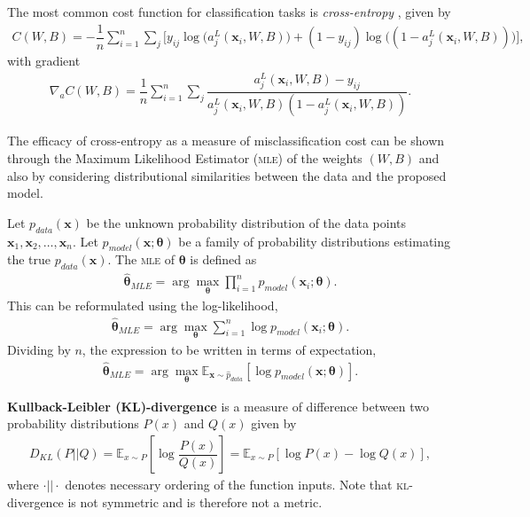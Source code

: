 The most common cost function for classification tasks is \textit{cross-entropy} \cite{Nielson2015}, given by
\begin{align}\label{nnets-cross-entropy-eq}
	C(W,B) = -\dfrac{1}{n}\sum_{i=1}^n\sum_j\big[y_{ij}\log\big(a_j^L(\mathbf{x}_i,W,B)\big) + (1 - y_{ij})\log\big( (1 - a_j^L(\mathbf{x}_i,W,B))\big)\big],
\end{align}
with gradient
\begin{align}
	\nabla_aC(W,B) = \dfrac{1}{n}\sum_{i=1}^n\sum_j\dfrac{a_j^L(\mathbf{x}_i,W,B) - y_{ij}}{a_j^L(\mathbf{x}_i,W,B)(1-a_j^L(\mathbf{x}_i,W,B))}.
\end{align}

The efficacy of cross-entropy as a measure of misclassification cost can be shown through the Maximum Likelihood Estimator (\textsc{mle}) of the weights $(W, B)$ and also by considering distributional similarities between the data and the proposed model.

Let ${p}_{data}(\mathbf{x})$ be the unknown probability distribution of the data points $\mathbf{x}_1, \mathbf{x}_2, \ldots, \mathbf{x}_n$. Let $p_{model}(\mathbf{x}; \mathbf{\theta})$ be a family of probability distributions estimating the true $p_{data}(\mathbf{x})$. The \textsc{mle} of $\mathbf{\theta}$ is defined as
\begin{align}
	\hat{\mathbf{\theta}}_{MLE} = \arg\max_{\mathbf{\theta}}\prod_{i=1}^np_{model}(\mathbf{x}_i;\mathbf{\theta}).
\end{align}
This can be reformulated using the log-likelihood,
\begin{align}
	\hat{\mathbf{\theta}}_{MLE} = \arg\max_{\mathbf{\theta}}\sum_{i=1}^n\log p_{model}(\mathbf{x}_i;\mathbf{\theta}).
\end{align}
Dividing by $n$, the expression to be written in terms of expectation,
\begin{align}\label{nnets-mle-eq}
	\hat{\mathbf{\theta}}_{MLE} = \arg\max_{\mathbf{\theta}}\mathbb{E}_{\mathbf{x}\sim \hat{p}_{data}}\left[\log p_{model}(\mathbf{x}; \mathbf{\theta})\right].
\end{align}

\begin{definition}
	\textbf{Kullback-Leibler (KL)-divergence} is a measure of difference between two probability distributions $P(x)$ and $Q(x)$ given by
	\begin{align}
		D_{KL}(P||Q) = \mathbb{E}_{x\sim P}\left[\log\dfrac{P(x)}{Q(x)}\right] = \mathbb{E}_{x\sim P}[\log P(x) - \log Q(x)],
	\end{align}
	where $\cdot||\cdot$ denotes necessary ordering of the function inputs. Note that \textsc{kl}-divergence is not symmetric and is therefore not a metric.	
\end{definition}

